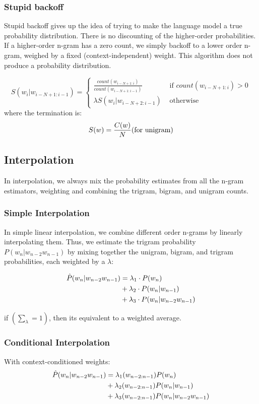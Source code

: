\subsubsection{Stupid backoff}
Stupid backoff gives up the idea of trying to make the language model a true probability distribution. There is no discounting of the higher-order probabilities. If a higher-order n-gram has a zero count, we simply backoff to a lower order n-gram, weighed by a fixed (context-independent) weight. This algorithm does not produce a probability distribution.

\[
    S(w_i|w_{i-N+1:i-1}) = \begin{cases}
        \displaystyle\frac{count(w_{i-N+1:i})}{count(w_{i-N+1:i-1})} & \text{ if $count(w_{i-N+1:i}) > 0$}\\[0.2cm]
        \lambda S(w_i|w_{i-N+2:i-1}) & \text{ otherwise}
    \end{cases}
\]
where the termination is:
\[
    S(w) = \displaystyle\frac{C(w)}{N} \hfill \text{(for unigram)}
\]

\subsection{Interpolation}
In interpolation, we always mix the probability estimates from all the n-gram estimators, weighting and combining the trigram, bigram, and unigram counts.

\subsubsection{Simple Interpolation}
In simple linear interpolation, we combine different order n-grams by linearly interpolating them. Thus, we estimate the trigram probability $P(w_n|w_{n-2}w_{n-1})$ by mixing together the unigram, bigram, and trigram probabilities, each weighted by a $\lambda$:

\begin{align}
    \hat{P}(w_n|w_{n-2}w_{n-1}) &= \lambda_1 \cdot P(w_n)  \\ \notag
    &+ \lambda_2 \cdot P(w_n|w_{n-1}) \\ \notag
    &+ \lambda_3 \cdot P(w_n|w_{n-2}w_{n-1}) \notag
\end{align}


if \( \left( \sum_\lambda = 1 \right)\), then its equivalent to a weighted average.

\subsubsection{Conditional Interpolation}
With context-conditioned weights:
\begin{align}
    \hat{P}(w_n|w_{n-2}w_{n-1}) &= \lambda_1(w_{n-2:n-1})P(w_n) \\ \notag
    &+ \lambda_2(w_{n-2:n-1})P(w_n|w_{n-1}) \\ \notag
    &+ \lambda_3(w_{n-2:n-1})P(w_n|w_{n-2}w_{n-1}) \\ \notag
\end{align}

